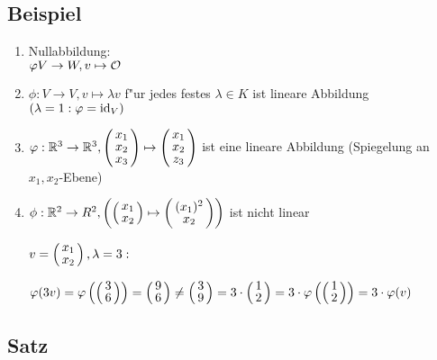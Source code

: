 \subsection{Beispiel}
\begin{enumerate}
	\item
	Nullabbildung:\\
	$\varphi V \rightarrow W, v \mapsto \mathcal{O}$
	\item
	$\phi : V \rightarrow V, v \mapsto \lambda v$ f"ur jedes festes $\lambda \in K$ ist lineare Abbildung $(\lambda = 1: \varphi = \mathrm{ id }_V )$
	\item
	$\varphi : \R^3 \rightarrow \R^3, \vct{x_1\\ x_2\\ x_3}\mapsto \vct{x_1 \\ x_2 \\ z_3}$ ist eine lineare Abbildung (Spiegelung an $x_1, x_2$-Ebene) 
	\item
	$\phi : \R^ 2 \rightarrow R^2, \left(	\vct{x_1 \\ x_2} \mapsto \vct{(x_1)^2 \\ x_2 }\right)$ ist nicht linear
	
	$v= \vct{x_1 \\ x_2}, \lambda =3:$
	
	 $\varphi(3v)= \varphi\left(\vct{3 \\ 6}\right)=  \vct{9 \\ 6} \neq \vct{3 \\ 9} = 3 \cdot \vct{1\\2}= 3 \cdot \varphi \left(\vct{1\\2} \right) = 3 \cdot \varphi(v)$
	 \\

\end{enumerate}

\subsection{Satz}
\subsection{}
\subsection{}
\subsection{}
\subsection{}